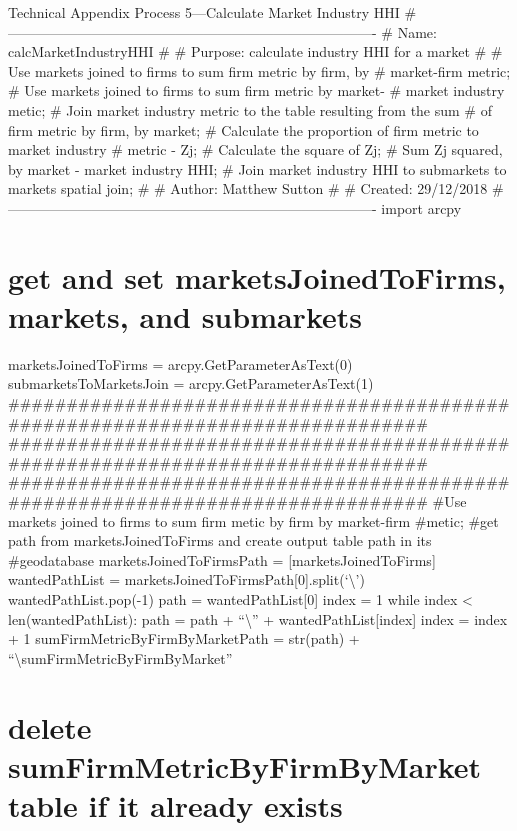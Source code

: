 \documentclass[]{article}
\begin{document}
Technical Appendix Process 5---Calculate Market Industry HHI
\#-------------------------------------------------------------------------------
\# Name: calcMarketIndustryHHI \# \# Purpose: calculate industry HHI for
a market \# \# Use markets joined to firms to sum firm metric by firm,
by \# market-firm metric; \# Use markets joined to firms to sum firm
metric by market- \# market industry metic; \# Join market industry
metric to the table resulting from the sum \# of firm metric by firm, by
market; \# Calculate the proportion of firm metric to market industry \#
metric - Zj; \# Calculate the square of Zj; \# Sum Zj squared, by market
- market industry HHI; \# Join market industry HHI to submarkets to
markets spatial join; \# \# Author: Matthew Sutton \# \# Created:
29/12/2018
\#-------------------------------------------------------------------------------
import arcpy

\section{get and set marketsJoinedToFirms, markets, and
submarkets}\label{get-and-set-marketsjoinedtofirms-markets-and-submarkets}

marketsJoinedToFirms = arcpy.GetParameterAsText(0)
submarketsToMarketsJoin = arcpy.GetParameterAsText(1)
\#\#\#\#\#\#\#\#\#\#\#\#\#\#\#\#\#\#\#\#\#\#\#\#\#\#\#\#\#\#\#\#\#\#\#\#\#\#\#\#\#\#\#\#\#\#\#\#\#\#\#\#\#\#\#\#\#\#\#\#\#\#\#\#\#\#\#\#\#\#\#\#\#\#\#\#\#\#\#
\#\#\#\#\#\#\#\#\#\#\#\#\#\#\#\#\#\#\#\#\#\#\#\#\#\#\#\#\#\#\#\#\#\#\#\#\#\#\#\#\#\#\#\#\#\#\#\#\#\#\#\#\#\#\#\#\#\#\#\#\#\#\#\#\#\#\#\#\#\#\#\#\#\#\#\#\#\#\#
\#\#\#\#\#\#\#\#\#\#\#\#\#\#\#\#\#\#\#\#\#\#\#\#\#\#\#\#\#\#\#\#\#\#\#\#\#\#\#\#\#\#\#\#\#\#\#\#\#\#\#\#\#\#\#\#\#\#\#\#\#\#\#\#\#\#\#\#\#\#\#\#\#\#\#\#\#\#\#
\#Use markets joined to firms to sum firm metic by firm by market-firm
\#metic; \#get path from marketsJoinedToFirms and create output table
path in its \#geodatabase marketsJoinedToFirmsPath =
{[}marketsJoinedToFirms{]} wantedPathList =
marketsJoinedToFirmsPath{[}0{]}.split(`\textbackslash{}')
wantedPathList.pop(-1) path = wantedPathList{[}0{]} index = 1 while
index \textless{} len(wantedPathList): path = path +
``\textbackslash{}'' + wantedPathList{[}index{]} index = index + 1
sumFirmMetricByFirmByMarketPath = str(path) +
``\textbackslash{}sumFirmMetricByFirmByMarket''

\section{delete sumFirmMetricByFirmByMarket table if it already
exists}\label{delete-sumfirmmetricbyfirmbymarket-table-if-it-already-exists}
\end{document}
